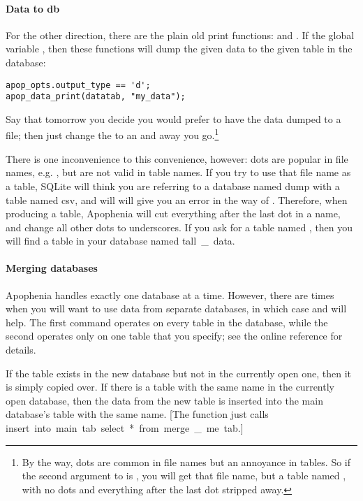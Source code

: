 \paragraph{Data to db} For the other direction, there are the plain old
print functions:  and
. If the global variable
, then these functions will dump the
given data to the given table in the database:
\begin{lstlisting}
apop_opts.output_type == 'd';
apop_data_print(datatab, "my_data");
\end{lstlisting}
Say that tomorrow you decide you would prefer to have the data dumped to
a file; then just change the  to an  and away you go.\footnote{By the way, dots are common in file names but an annoyance in tables. So if the second argument to  is , you will get that file name, but a table named , with no dots and everything after the last dot stripped away.}

There is one inconvenience to this convenience, however: dots are popular
in file names, e.g. , but are not valid in table names. If
you try to use that file name as a table, SQLite will think you are
referring to a database named \si{dump} with a table named \si{csv},
and will will give you an error in the way of .
Therefore, when producing a table, Apophenia will cut everything after
the last dot in a name, and change all other dots to underscores. If you
ask for a table named , then you will find a table in
your database named \si{tall\_data}.

\paragraph{Merging databases} Apophenia handles exactly one database at
a time. However, there are times when you will want to use data
from separate databases, in which case  and
 will help.  The first command
operates on every table in the database, while the second operates only
on one table that you specify; see the online reference for details.

If the table exists in the new database but not in the currently open
one, then it is simply copied over. If there is a table with the same
name in the currently open database, then the data from the new table is
inserted into the main database's table with the same name. [The function
just calls \si{insert into main.tab select * from merge\_me.tab}.]

